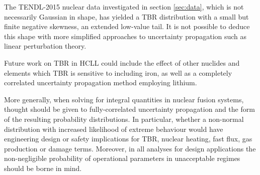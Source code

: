 The TENDL-2015 nuclear data investigated in section \ref{sec:data}, which is not necessarily Gaussian in shape, has yielded a TBR distribution with a small but finite negative skewness, an extended low-value tail. It is not possible to deduce this shape with more simplified approaches to uncertainty propagation such as linear perturbation theory.

Future work on TBR in HCLL could include the effect of other nuclides and elements which TBR is sensitive to including iron, as well as a completely correlated uncertainty propagation method employing lithium. 

More generally, when solving for integral quantities in nuclear fusion systems, thought should be given to fully-correlated uncertainty propagation and the form of the resulting probability distributions. In particular, whether a non-normal distribution with increased likelihood of extreme behaviour would have engineering design or safety implications for TBR, nuclear heating, fast flux, gas production or damage terms. Moreover, in all analyses for design applications the non-negligible probability of operational parameters in unacceptable regimes should be borne in mind.

